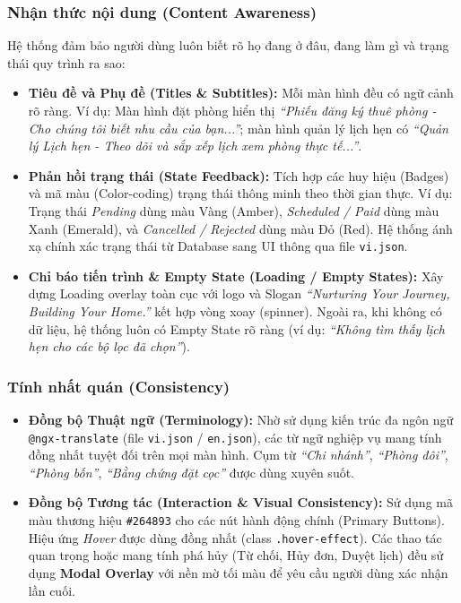 \subsubsection{Nhận thức nội dung (Content Awareness)}
Hệ thống đảm bảo người dùng luôn biết rõ họ đang ở đâu, đang làm gì và trạng thái quy trình ra sao:
\begin{itemize}[leftmargin=*, nosep]
    \item \textbf{Tiêu đề và Phụ đề (Titles \& Subtitles):} Mỗi màn hình đều có ngữ cảnh rõ ràng. Ví dụ: Màn hình đặt phòng hiển thị \textit{``Phiếu đăng ký thuê phòng - Cho chúng tôi biết nhu cầu của bạn...''}; màn hình quản lý lịch hẹn có \textit{``Quản lý Lịch hẹn - Theo dõi và sắp xếp lịch xem phòng thực tế...''}.
    \item \textbf{Phản hồi trạng thái (State Feedback):} Tích hợp các huy hiệu (Badges) và mã màu (Color-coding) trạng thái thông minh theo thời gian thực. Ví dụ: Trạng thái \textit{Pending} dùng màu Vàng (Amber), \textit{Scheduled / Paid} dùng màu Xanh (Emerald), và \textit{Cancelled / Rejected} dùng màu Đỏ (Red). Hệ thống ánh xạ chính xác trạng thái từ Database sang UI thông qua file \texttt{vi.json}.
    \item \textbf{Chỉ báo tiến trình \& Empty State (Loading / Empty States):} Xây dựng Loading overlay toàn cục với logo và Slogan \textit{``Nurturing Your Journey, Building Your Home.''} kết hợp vòng xoay (spinner). Ngoài ra, khi không có dữ liệu, hệ thống luôn có Empty State rõ ràng (ví dụ: \textit{``Không tìm thấy lịch hẹn cho các bộ lọc đã chọn''}).
\end{itemize}

\subsubsection{Tính nhất quán (Consistency)}
\begin{itemize}[leftmargin=*, nosep]
    \item \textbf{Đồng bộ Thuật ngữ (Terminology):} Nhờ sử dụng kiến trúc đa ngôn ngữ \texttt{@ngx-translate} (file \texttt{vi.json} / \texttt{en.json}), các từ ngữ nghiệp vụ mang tính đồng nhất tuyệt đối trên mọi màn hình. Cụm từ \textit{``Chi nhánh''}, \textit{``Phòng đôi''}, \textit{``Phòng bốn''}, \textit{``Bằng chứng đặt cọc''} được dùng xuyên suốt.
    \item \textbf{Đồng bộ Tương tác (Interaction \& Visual Consistency):} Sử dụng mã màu thương hiệu \texttt{\#264893} cho các nút hành động chính (Primary Buttons). Hiệu ứng \textit{Hover} được dùng đồng nhất (class \texttt{.hover-effect}). Các thao tác quan trọng hoặc mang tính phá hủy (Từ chối, Hủy đơn, Duyệt lịch) đều sử dụng \textbf{Modal Overlay} với nền mờ tối màu để yêu cầu người dùng xác nhận lần cuối.
\end{itemize}

